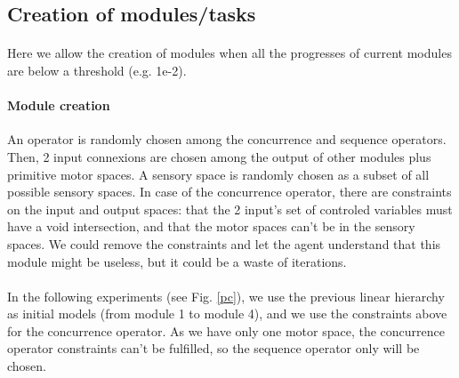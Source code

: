 \documentclass[12pt]{article}
\begin{document}
		
	\subsection{Creation of modules/tasks}
	
		
		\paragraph{}
		Here we allow the creation of modules when all the progresses of current modules are below a threshold (e.g. 1e-2).
		
		\paragraph{Module creation}
		An operator is randomly chosen among the concurrence and sequence operators.
		Then, 2 input connexions are chosen among the output of other modules plus primitive motor spaces.
		A sensory space is randomly chosen as a subset of all possible sensory spaces.
		In case of the concurrence operator, there are constraints on the input and output spaces: that the 2 input's set of controled variables must have a void intersection, 
		and that the motor spaces can't be in the sensory spaces.
		We could remove the constraints and let the agent understand that this module might be useless, but it could be a waste of iterations.
		
		\paragraph{}
		In the following experiments (see Fig. \ref{pc}), we use the previous linear hierarchy as initial models (from module 1 to module 4), and we use the constraints above for the concurrence operator.
		As we have only one motor space, the concurrence operator constraints can't be fulfilled, so the sequence operator only will be chosen.
		
		
		
\end{document}
